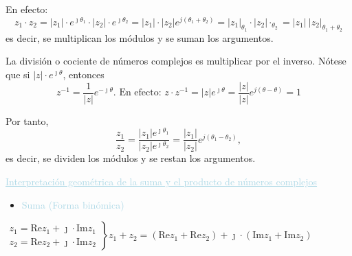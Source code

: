 \documentclass[12pt]{article}
\begin{document}
En efecto: $$z_1\cdot z_2=|z_1|\cdot
e^{\jmath\theta_1}\cdot|z_2|\cdot
e^{\jmath\theta_2}=|z_1|\cdot|z_2|e^{j(\theta_1+\theta_2)}=|z_1|_{\theta_1}\cdot|z_2|\cdot_{\theta_2}=|z_1|~|z_2|_{\theta_1+\theta_2}$$
es decir, se multiplican los módulos y se suman los argumentos.

La división o cociente de números complejos es multiplicar por
el inverso. Nótese que si $|z|\cdot e^{\jmath\theta}$, entonces
\[z^{-1}=\frac{1}{|z|}e^{-\jmath \theta}\text{. En efecto: }z\cdot
z^{-1}=|z|e^{\jmath\theta}=\frac{|z|}{|z|}e^{j(\theta-\theta)}=1\]

Por tanto,
\[\frac{z_1}{z_2}=\frac{|z_1|e^{\jmath\theta_1}}{|z_2|e^{\jmath\theta_2}}=\frac{|z_1|}{|z_2|}e^{j(\theta_1-\theta_2)},\]
es decir, se dividen los módulos y se restan los argumentos.

\textcolor{lightblue}{\underline{Interpretación geométrica de la
suma y el producto de números complejos}}
\begin{itemize}[label=\color{red}\textbullet]
    \item \textcolor{lightblue}{Suma (Forma binómica)}
\end{itemize}

$\left.\begin{array}{l}
        z_1=\text{Re}z_1+\jmath \cdot\text{Im}z_1 \\
        z_2=\text{Re}z_2+\jmath \cdot\text{Im}z_2
\end{array}\right\}z_1+z_2=(\text{Re}z_1+\text{Re}z_2)+\jmath \cdot(\text{Im}z_1+\text{Im}z_2)$
\end{document}
